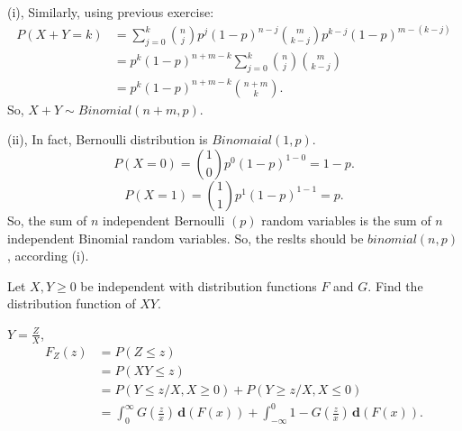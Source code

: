 \documentclass[en, normal, 11pt, black]{elegantnote}
\newenvironment{exercise}[1]{\begin{tcolorbox}[colback=black!15, colframe=black!80, breakable, title=#1]}{\end{tcolorbox}}
\renewenvironment{proof}{\begin{tcolorbox}[colback=white, colframe=black!50, breakable, title=Proof. ]\setlength{\parskip}{0.8em}}{\,\\\rightline{$\square$}\end{tcolorbox}}
\newcommand{\der}{\,\mathbf{d}}
\begin{document}
    \begin{proof}
        (i), Similarly, using previous exercise: 
        \[
            \begin{aligned}
            P(X+Y=k) &=\sum_{j=0}^{k}\binom{n}{j} p^{j}(1-p)^{n-j}\binom{m}{k-j} p^{k-j}(1-p)^{m-(k-j)} \\
            &=p^{k}(1-p)^{n+m-k} \sum_{j=0}^{k}\binom{n}{j}\binom{m}{k-j} \\
            &=p^{k}(1-p)^{n+m-k}\binom{n+m}{k}. 
            \end{aligned}
        \]
        So, $X+Y\sim Binomial(n+m,p)$. 

        (ii), In fact, Bernoulli distribution is $Binomaial(1,p)$. 
        \[
            P(X=0)=\binom{1}{0}p^0(1-p)^{1-0}=1-p. 
        \]
        \[
            P(X=1)=\binom{1}{1}p^1(1-p)^{1-1}=p. 
        \]
        So, the sum of $n$ independent Bernoulli $(p)$ random variables is the sum of $n$ independent Binomial random variables. So, the reslts should be $binomial(n,p)$, according (i). 
    \end{proof}

    \begin{exercise}{2.1.14}
        Let $X, Y \geq 0$ be independent with distribution functions $F$ and $G$. Find the distribution function of $X Y$. 
    \end{exercise}

    \begin{proof}
        $Y=\frac{Z}{X}$, 
        \[
            \begin{aligned}
                F_{Z}(z) &= P(Z \leq z) \\
                &=P(X Y \leq z) \\
                &=P(Y \leq z / X, X \geq 0)+P(Y \geq z / X, X \leq 0) \\
                &=\int_{0}^{\infty} G\left(\frac{z}{x}\right) \der (F(x)) +\int_{-\infty}^{0} 1-G\left(\frac{z}{x}\right) \der (F(x)). 
            \end{aligned}
        \]
    \end{proof}
\end{document}
